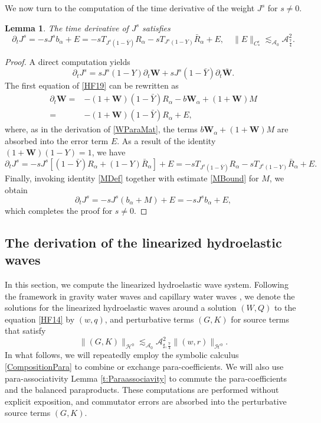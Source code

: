 \documentclass[10pt]{amsart}
\newtheorem{lemma}[theorem]{Lemma}
\theoremstyle{remark}
\theoremstyle{definition}
\numberwithin{equation}{section}
\newcommand{\p}{\partial}
\renewcommand{\H}{{\mathcal H }}
\newcommand{\al}{\alpha}
\newcommand{\f}{\frac}
\newcommand{\bw}{\mathbf{W}}
\newcommand{\CalAZ}{{\mathcal{A}_0}}
\newcommand{\ASSharp}{{\mathcal{A}_{\sharp,\frac{7}{4}}^2}}
\begin{document}
We now turn to the computation of the time derivative of the weight $J^s$ for $s\neq 0$.
\begin{lemma} \label{t:JsParaMat}
The time derivative of $J^s$ satisfies 
\begin{equation*}
\partial_t J^s = -sJ^s b_\alpha +E=  -s T_{J^s(1-\bar{Y})}R_\alpha -s T_{J^s (1-Y)}\bar{R}_\alpha+E, \quad   \| E\|_{C_{*}^{\epsilon}} \lesssim_\CalAZ \mathcal{A}^2_{\f74}.
\end{equation*}
\end{lemma}
\begin{proof}
A direct computation yields
\begin{equation*}
\p_t J^s =sJ^{s}(1-Y)\p_t\bw + sJ^{s}(1-\bar{Y})\p_t\bar{\bw}.
\end{equation*}
The first equation of \eqref{HF19} can be rewritten as
\begin{align*}
\p_t\bw =& -(1+\bw)(1-\bar{Y})R_\alpha -b\bw_\al  +(1+\bw)M \\
=& -(1+\bw)(1-\bar{Y})R_\alpha +E,
\end{align*}
where, as in the derivation of \eqref{WParaMat}, the terms $b\bw_\al  +(1+\bw)M$ are absorbed into the error term $E$.
As a result of the identity $(1+\bw)(1-Y)=1$, we have 
\begin{equation*}
\p_tJ^s = -sJ^{s}[(1-\bar{Y})R_\alpha + (1-Y)\bar{R}_\alpha]+E = -s T_{J^s(1-\bar{Y})}R_\alpha -s T_{J^s (1-Y)}\bar{R}_\alpha + E.
\end{equation*}
Finally, invoking identity \eqref{MDef} together with estimate \eqref{MBound} for $M$, we obtain
\begin{equation*}
 \p_t J^s  =  -sJ^{s}(b_\alpha +M)+E = -sJ^{s}b_\alpha +E,
\end{equation*}
which completes the proof for $s\neq 0$.
\end{proof}

\subsection{The derivation of the linearized hydroelastic waves}
In this section, we compute the linearized hydroelastic wave system.
Following the framework in gravity  water waves \cite{MR3535894} and capillary water waves \cite{MR3667289}, we denote the solutions for the linearized hydroelastic waves around a solution $(W, Q)$ to the equation \eqref{HF14} by $(w,q)$, and perturbative terms $(G,K)$ for source terms that satisfy
\begin{equation*}
    \|(G,K)\|_{\H^0} \lesssim_\CalAZ \ASSharp \|(w,r)\|_{\H^0}.
\end{equation*}
In what follows, we will repeatedly employ the symbolic calculus \eqref{CompositionPara} to combine or exchange para-coefficients.
We will also use para-associativity Lemma \ref{t:Paraassociavity} to commute the para-coefficients and the balanced paraproducts.
These computations are performed without explicit exposition, and commutator errors are absorbed into the perturbative source terms $(G,K)$. 
\end{document}
